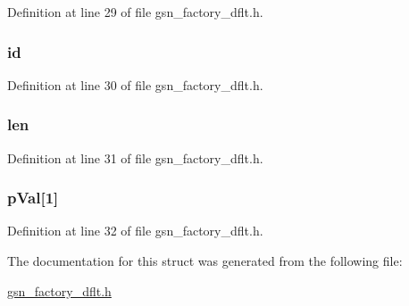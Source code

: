 Definition at line 29 of file gsn\_\-factory\_\-dflt.h.

\hypertarget{a00073_a583a14d715339a2c22d205223d366263}{
\subsubsection[{id}]{ {\bf id}}}
\label{a00073_a583a14d715339a2c22d205223d366263}


Definition at line 30 of file gsn\_\-factory\_\-dflt.h.

\hypertarget{a00073_a197a42ec85f4898bd19c17b05bc07d81}{
\subsubsection[{len}]{ {\bf len}}}
\label{a00073_a197a42ec85f4898bd19c17b05bc07d81}


Definition at line 31 of file gsn\_\-factory\_\-dflt.h.

\hypertarget{a00073_aac3aa951034de2d06e73a17373c764f3}{
\subsubsection[{pVal}]{ {\bf pVal}\mbox{[}1\mbox{]}}}
\label{a00073_aac3aa951034de2d06e73a17373c764f3}


Definition at line 32 of file gsn\_\-factory\_\-dflt.h.



The documentation for this struct was generated from the following file:\begin{DoxyCompactItemize}
\item 
\hyperlink{a00499}{gsn\_\-factory\_\-dflt.h}\end{DoxyCompactItemize}
